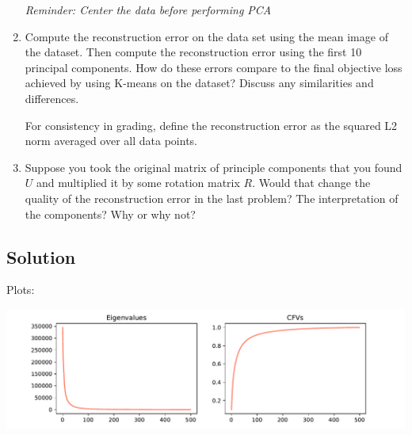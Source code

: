 \documentclass[submit]{harvardml}
\begin{document}
\begin{problem}
\begin{enumerate}
  \textit{Reminder: Center the data before performing PCA}

\item Compute the reconstruction error on the data set using the mean
  image of the dataset.  Then compute the reconstruction error using
  the first 10 principal components.  How do these errors compare to
  the final objective loss achieved by using K-means on the dataset?
  Discuss any similarities and differences.

  For consistency in grading, define the reconstruction error as the squared L2
  norm averaged over all data points.

\item Suppose you took the original matrix of principle components
  that you found $U$ and multiplied it by some rotation matrix $R$.
  Would that change the quality of the reconstruction error in the
  last problem?  The interpretation of the components?  Why or why
  not?
  
\end{enumerate}


\end{problem}

\newpage
\subsection*{Solution}
Plots:

 \includegraphics[width=\linewidth]{HW5/p2_cfvs (6).pdf}
\end{document}
